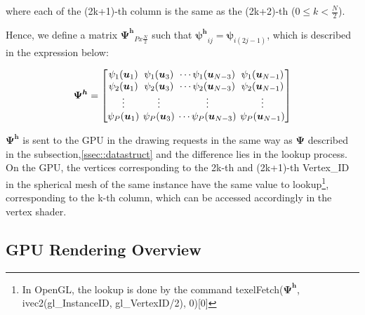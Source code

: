 \documentclass[twoside,twocolumn,10pt]{article}
\begin{document}
where each of the (2k+1)-th column is the same as the (2k+2)-th ($0 \leq k < \frac{N}{2}$).

Hence, we define a matrix $\bm{\Psi^h}_{Px\frac{N}{2}}$ such that $\bm{\psi^h}_{ij} = \bm{\psi}_{i(2j-1)}$, which is described in the expression below:


\begin{equation*}
\label{eq::Psi_changed}
\bm{\Psi^h} = 
\begingroup %
\setlength\arraycolsep{2pt}
\begin{bmatrix} 
    \psi_1(\bm{u}_1) & \psi_1(\bm{u}_3) & \cdots \psi_1(\bm{u}_{N-3}) & \psi_1(\bm{u}_{N-1})  \\
    
     \psi_2(\bm{u}_1)& \psi_2(\bm{u}_3) & \cdots \psi_2(\bm{u}_{N-3}) & \psi_2(\bm{u}_{N-1}) \\

    \vdots & \vdots & \vdots & \vdots  \\
    
     \psi_P(\bm{u}_1)&\psi_P(\bm{u}_3) & \cdots \psi_P(\bm{u}_{N-3}) & \psi_P(\bm{u}_{N-1})
    
\end{bmatrix}
\endgroup
\end{equation*}

$\bm{\Psi^h}$ is sent to the GPU in the drawing requests in the same way as $\bm{\Psi}$ described in the subsection,\ref{ssec::datastruct} and the difference lies in the lookup process. On the GPU, the vertices corresponding to the 2k-th and (2k+1)-th Vertex\_ID in the spherical mesh of the same instance have the same value to lookup\footnote{In OpenGL, the lookup is done by the command texelFetch($\bm{\Psi^h}$, ivec2(gl\_InstanceID, gl\_VertexID/2), 0)[0]}, corresponding to the k-th column, which can be accessed accordingly in the vertex shader.




\subsection{GPU Rendering Overview}
\label{ssec::rendering}
\end{document}
